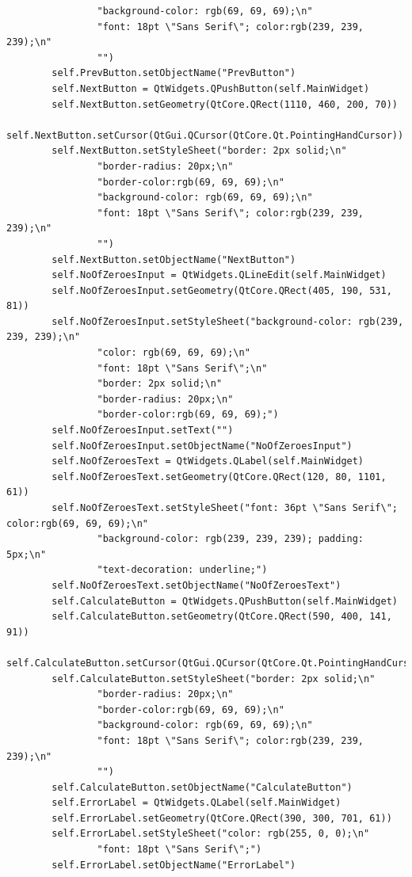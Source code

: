 \documentclass[12pt]{article}
\begin{document}
\begin{lstlisting}
                "background-color: rgb(69, 69, 69);\n"
                "font: 18pt \"Sans Serif\"; color:rgb(239, 239, 239);\n"
                "")
        self.PrevButton.setObjectName("PrevButton")
        self.NextButton = QtWidgets.QPushButton(self.MainWidget)
        self.NextButton.setGeometry(QtCore.QRect(1110, 460, 200, 70))
        self.NextButton.setCursor(QtGui.QCursor(QtCore.Qt.PointingHandCursor))
        self.NextButton.setStyleSheet("border: 2px solid;\n"
                "border-radius: 20px;\n"
                "border-color:rgb(69, 69, 69);\n"
                "background-color: rgb(69, 69, 69);\n"
                "font: 18pt \"Sans Serif\"; color:rgb(239, 239, 239);\n"
                "")
        self.NextButton.setObjectName("NextButton")
        self.NoOfZeroesInput = QtWidgets.QLineEdit(self.MainWidget)
        self.NoOfZeroesInput.setGeometry(QtCore.QRect(405, 190, 531, 81))
        self.NoOfZeroesInput.setStyleSheet("background-color: rgb(239, 239, 239);\n"
                "color: rgb(69, 69, 69);\n"
                "font: 18pt \"Sans Serif\";\n"
                "border: 2px solid;\n"
                "border-radius: 20px;\n"
                "border-color:rgb(69, 69, 69);")
        self.NoOfZeroesInput.setText("")
        self.NoOfZeroesInput.setObjectName("NoOfZeroesInput")
        self.NoOfZeroesText = QtWidgets.QLabel(self.MainWidget)
        self.NoOfZeroesText.setGeometry(QtCore.QRect(120, 80, 1101, 61))
        self.NoOfZeroesText.setStyleSheet("font: 36pt \"Sans Serif\"; color:rgb(69, 69, 69);\n"
                "background-color: rgb(239, 239, 239); padding: 5px;\n"
                "text-decoration: underline;")
        self.NoOfZeroesText.setObjectName("NoOfZeroesText")
        self.CalculateButton = QtWidgets.QPushButton(self.MainWidget)
        self.CalculateButton.setGeometry(QtCore.QRect(590, 400, 141, 91))
        self.CalculateButton.setCursor(QtGui.QCursor(QtCore.Qt.PointingHandCursor))
        self.CalculateButton.setStyleSheet("border: 2px solid;\n"
                "border-radius: 20px;\n"
                "border-color:rgb(69, 69, 69);\n"
                "background-color: rgb(69, 69, 69);\n"
                "font: 18pt \"Sans Serif\"; color:rgb(239, 239, 239);\n"
                "")
        self.CalculateButton.setObjectName("CalculateButton")
        self.ErrorLabel = QtWidgets.QLabel(self.MainWidget)
        self.ErrorLabel.setGeometry(QtCore.QRect(390, 300, 701, 61))
        self.ErrorLabel.setStyleSheet("color: rgb(255, 0, 0);\n"
                "font: 18pt \"Sans Serif\";")
        self.ErrorLabel.setObjectName("ErrorLabel")


\end{lstlisting}
\end{document}
